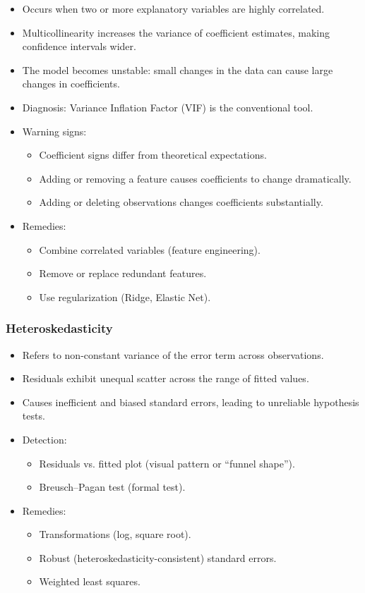 \documentclass[10pt,a4paper]{article}
\begin{document}
	\begin{itemize}
		\item Occurs when two or more explanatory variables are highly correlated.
		\item Multicollinearity increases the variance of coefficient estimates, making confidence intervals wider.
		\item The model becomes unstable: small changes in the data can cause large changes in coefficients.
		\item Diagnosis: Variance Inflation Factor (VIF) is the conventional tool.
		\item Warning signs:
		\begin{itemize}
			\item Coefficient signs differ from theoretical expectations.
			\item Adding or removing a feature causes coefficients to change dramatically.
			\item Adding or deleting observations changes coefficients substantially.
		\end{itemize}
		\item Remedies:
		\begin{itemize}
			\item Combine correlated variables (feature engineering).
			\item Remove or replace redundant features.
			\item Use regularization (Ridge, Elastic Net).
		\end{itemize}
	\end{itemize}

	\subsubsection{Heteroskedasticity}

	\begin{itemize}
		\item Refers to non-constant variance of the error term across observations.
		\item Residuals exhibit unequal scatter across the range of fitted values.
		\item Causes inefficient and biased standard errors, leading to unreliable hypothesis tests.
		\item Detection:
		\begin{itemize}
			\item Residuals vs. fitted plot (visual pattern or “funnel shape”).
			\item Breusch–Pagan test (formal test).
		\end{itemize}
		\item Remedies:
		\begin{itemize}
			\item Transformations (log, square root).
			\item Robust (heteroskedasticity-consistent) standard errors.
			\item Weighted least squares.
		\end{itemize}
	\end{itemize}
\end{document}
